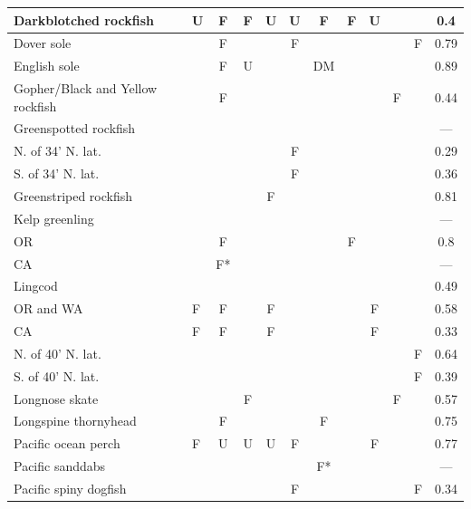 \documentclass[11pt,
  english,
  a4paper,
]{article}
\begin{document}
\begin{landscape}
\begin{longtable}[t]{>{\raggedright\arraybackslash}p{6cm}lcccccccccc}
\midrule
Darkblotched rockfish & U & F & F & U & U & F & F & U &  &  & 0.4\\
\midrule
Dover sole &  & F &  &  & F &  &  &  &  & F & 0.79\\
\midrule
English sole &  & F & U &  &  & DM &  &  &  &  & 0.89\\
\midrule
Gopher/Black and Yellow rockfish &  & F &  &  &  &  &  &  & F &  & 0.44\\
\midrule
Greenspotted rockfish &  &  &  &  &  &  &  &  &  &  & ---\\
\midrule
\hspace{3mm}N. of 34\textdegree 47' N. lat. &  &  &  &  & F &  &  &  &  &  & 0.29\\
\midrule
\hspace{3mm}S. of 34\textdegree 47' N. lat. &  &  &  &  & F &  &  &  &  &  & 0.36\\
\midrule
Greenstriped rockfish &  &  &  & F &  &  &  &  &  &  & 0.81\\
\midrule
Kelp greenling &  &  &  &  &  &  &  &  &  &  & ---\\
\midrule
\hspace{3mm}OR &  & F &  &  &  &  & F &  &  &  & 0.8\\
\midrule
\hspace{3mm}CA &  & F* &  &  &  &  &  &  &  &  & ---\\
\midrule
Lingcod &  &  &  &  &  &  &  &  &  &  & 0.49\\
\midrule
\hspace{3mm}OR and WA & F & F &  & F &  &  &  & F &  &  & 0.58\\
\midrule
\hspace{3mm}CA & F & F &  & F &  &  &  & F &  &  & 0.33\\
\midrule
\hspace{3mm}N. of 40\textdegree 10' N. lat. &  &  &  &  &  &  &  &  &  & F & 0.64\\
\midrule
\hspace{3mm}S. of 40\textdegree 10' N. lat. &  &  &  &  &  &  &  &  &  & F & 0.39\\
\midrule
Longnose skate &  &  & F &  &  &  &  &  & F &  & 0.57\\
\midrule
Longspine thornyhead &  & F &  &  &  & F &  &  &  &  & 0.75\\
\midrule
Pacific ocean perch & F & U & U & U & F &  &  & F &  &  & 0.77\\
\midrule
Pacific sanddabs &  &  &  &  &  & F* &  &  &  &  & ---\\
\midrule
Pacific spiny dogfish &  &  &  &  & F &  &  &  &  & F & 0.34\\

\end{longtable}
\end{landscape}
\end{document}
